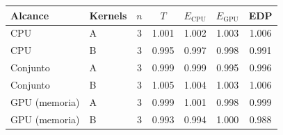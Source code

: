 \begin{tabular}{@{}llccccc@{}}
\toprule
\textbf{Alcance} & \textbf{Kernels} & \textbf{$n$} & \textbf{$T$} & \textbf{$E_{\mathrm{CPU}}$} & \textbf{$E_{\mathrm{GPU}}$} & \textbf{EDP} \\
\midrule
CPU & A & 3 & 1.001 & 1.002 & 1.003 & 1.006 \\
CPU & B & 3 & 0.995 & 0.997 & 0.998 & 0.991 \\
Conjunto & A & 3 & 0.999 & 0.999 & 0.995 & 0.996 \\
Conjunto & B & 3 & 1.005 & 1.004 & 1.003 & 1.006 \\
GPU (memoria) & A & 3 & 0.999 & 1.001 & 0.998 & 0.999 \\
GPU (memoria) & B & 3 & 0.993 & 0.994 & 1.000 & 0.988 \\
\bottomrule
\end{tabular}

